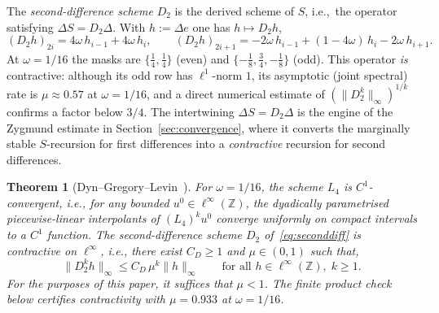 \documentclass{article}
\theoremstyle{plain}
\newtheorem{theorem}{Theorem}[section]
\theoremstyle{definition}
\newcommand{\Z}{\mathbb{Z}}
\newcommand{\Lop}{L_4}
\newcommand{\norm}[1]{\lVert #1 \rVert}
\begin{document}
The \emph{second-difference scheme} $D_2$ is the derived scheme of $S$, i.e.,\
the operator satisfying $\Delta S=D_2\Delta$. With $h:=\Delta e$ one has
$h\mapsto D_2 h$,
\begin{equation}\label{eq:seconddiff}
  (D_2 h)_{2i} = 4\omega\,h_{i-1} + 4\omega\,h_{i}, \qquad
  (D_2 h)_{2i+1} = -2\omega\,h_{i-1} + (1-4\omega)\,h_i - 2\omega\,h_{i+1}.
\end{equation}
At $\omega=1/16$ the masks are $\{\tfrac14,\tfrac14\}$ (even) and
$\{-\tfrac18,\tfrac34,-\tfrac18\}$ (odd). This operator \emph{is} contractive:
although its odd row has $\ell^1$-norm $1$, its asymptotic (joint spectral) rate
is $\mu\approx0.57$ at $\omega=1/16$, and a direct numerical estimate of
$(\norm{D_2^k}_\infty)^{1/k}$ confirms a factor below $3/4$. The intertwining
$\Delta S=D_2\Delta$ is the engine of the Zygmund estimate in
Section~\ref{sec:convergence}, where it converts the marginally stable
$S$-recursion for first differences into a \emph{contractive} recursion for
second differences.

\begin{theorem}[Dyn--Gregory--Levin~\cite{DGL87, Dyn92}]\label{thm:dgl}
For $\omega=1/16$, the scheme $\Lop$ is $C^1$-convergent, i.e., for any bounded
$u^0\in\ell^\infty(\Z)$, the dyadically parametrised piecewise-linear
interpolants of $(\Lop)^k u^0$ converge uniformly on compact intervals to a
$C^1$ function. The second-difference scheme $D_2$ of~\eqref{eq:seconddiff} is
contractive on $\ell^\infty$, i.e., there exist $C_D\geq 1$ and $\mu\in(0,1)$
such that,
\begin{equation}\label{eq:contraction}
  \norm{D_2^k h}_\infty \leq C_D\,\mu^k\norm{h}_\infty
  \qquad\text{for all }h\in\ell^\infty(\Z),\;k\geq 1.
\end{equation}
For the purposes of this paper, it suffices that $\mu<1$. The finite product check
below certifies contractivity with $\mu=0.933$ at $\omega=1/16$.
\end{theorem}
\end{document}
